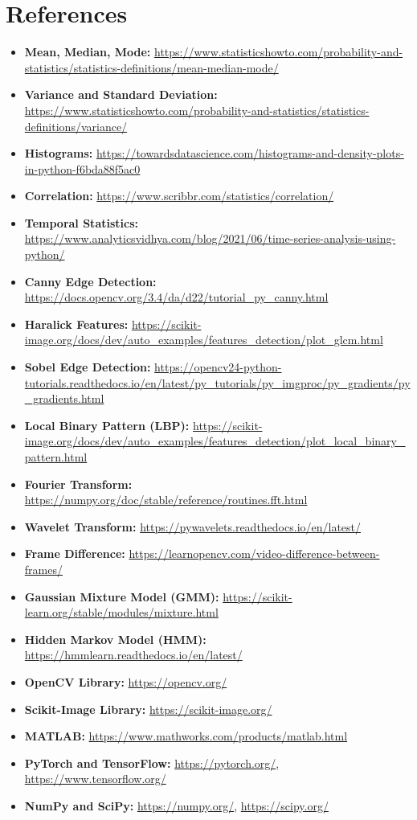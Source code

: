 \documentclass{article}
\title{}
\author{}
\date{}
\begin{document}
\maketitle

\section{References}
\begin{itemize}
    \item \textbf{Mean, Median, Mode:} \url{https://www.statisticshowto.com/probability-and-statistics/statistics-definitions/mean-median-mode/}
    \item \textbf{Variance and Standard Deviation:} \url{https://www.statisticshowto.com/probability-and-statistics/statistics-definitions/variance/}
    \item \textbf{Histograms:} \url{https://towardsdatascience.com/histograms-and-density-plots-in-python-f6bda88f5ac0}
    \item \textbf{Correlation:} \url{https://www.scribbr.com/statistics/correlation/}
    \item \textbf{Temporal Statistics:} \url{https://www.analyticsvidhya.com/blog/2021/06/time-series-analysis-using-python/}
    \item \textbf{Canny Edge Detection:} \url{https://docs.opencv.org/3.4/da/d22/tutorial_py_canny.html}
    \item \textbf{Haralick Features:} \url{https://scikit-image.org/docs/dev/auto_examples/features_detection/plot_glcm.html}
    \item \textbf{Sobel Edge Detection:} \url{https://opencv24-python-tutorials.readthedocs.io/en/latest/py_tutorials/py_imgproc/py_gradients/py_gradients.html}
    \item \textbf{Local Binary Pattern (LBP):} \url{https://scikit-image.org/docs/dev/auto_examples/features_detection/plot_local_binary_pattern.html}
    \item \textbf{Fourier Transform:} \url{https://numpy.org/doc/stable/reference/routines.fft.html}
    \item \textbf{Wavelet Transform:} \url{https://pywavelets.readthedocs.io/en/latest/}
    \item \textbf{Frame Difference:} \url{https://learnopencv.com/video-difference-between-frames/}
    \item \textbf{Gaussian Mixture Model (GMM):} \url{https://scikit-learn.org/stable/modules/mixture.html}
    \item \textbf{Hidden Markov Model (HMM):} \url{https://hmmlearn.readthedocs.io/en/latest/}
    \item \textbf{OpenCV Library:} \url{https://opencv.org/}
    \item \textbf{Scikit-Image Library:} \url{https://scikit-image.org/}
    \item \textbf{MATLAB:} \url{https://www.mathworks.com/products/matlab.html}
    \item \textbf{PyTorch and TensorFlow:} \url{https://pytorch.org/}, \url{https://www.tensorflow.org/}
    \item \textbf{NumPy and SciPy:} \url{https://numpy.org/}, \url{https://scipy.org/}
\end{itemize}
\end{document}

